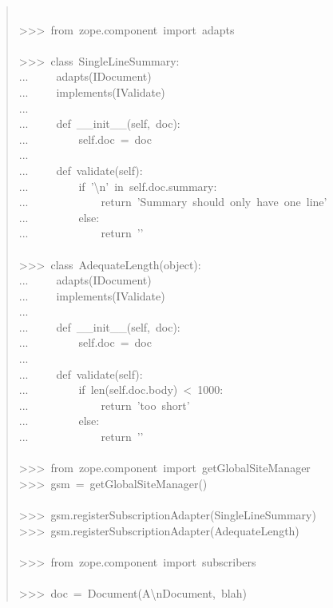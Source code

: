 \documentclass[a4paper,openany,twoside,final]{book}
\begin{document}
\begin{quote}
{~\\
>{}>{}>~from~zope.component~import~adapts\\
~\\
>{}>{}>~class~SingleLineSummary:\\
...~~~~~adapts(IDocument)\\
...~~~~~implements(IValidate)\\
...\\
...~~~~~def~\_\_init\_\_(self,~doc):\\
...~~~~~~~~~self.doc~=~doc\\
...\\
...~~~~~def~validate(self):\\
...~~~~~~~~~if~'\textbackslash{}n'~in~self.doc.summary:\\
...~~~~~~~~~~~~~return~'Summary~should~only~have~one~line'\\
...~~~~~~~~~else:\\
...~~~~~~~~~~~~~return~'{}'\\
~\\
>{}>{}>~class~AdequateLength(object):\\
...~~~~~adapts(IDocument)\\
...~~~~~implements(IValidate)\\
...\\
...~~~~~def~\_\_init\_\_(self,~doc):\\
...~~~~~~~~~self.doc~=~doc\\
...\\
...~~~~~def~validate(self):\\
...~~~~~~~~~if~len(self.doc.body)~<~1000:\\
...~~~~~~~~~~~~~return~'too~short'\\
...~~~~~~~~~else:\\
...~~~~~~~~~~~~~return~'{}'\\
~\\
>{}>{}>~from~zope.component~import~getGlobalSiteManager\\
>{}>{}>~gsm~=~getGlobalSiteManager()\\
~\\
>{}>{}>~gsm.registerSubscriptionAdapter(SingleLineSummary)\\
>{}>{}>~gsm.registerSubscriptionAdapter(AdequateLength)\\
~\\
>{}>{}>~from~zope.component~import~subscribers\\
~\\
>{}>{}>~doc~=~Document(\textquotedbl{}A\textbackslash{}nDocument\textquotedbl{},~\textquotedbl{}blah\textquotedbl{})\\
}
\end{quote}
\end{document}
